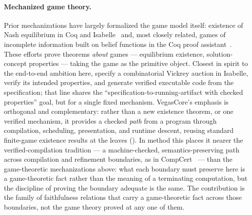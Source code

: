 \paragraph{Mechanized game theory.}
Prior mechanizations have largely formalized the game model itself: existence of
Nash equilibrium in Coq and Isabelle~\citep{LeRoux2017NashCoqIsabelle} and, most
closely related, games of incomplete information built on belief functions in
the Coq proof assistant~\citep{PomeretCoquot2023BelGames}.  These efforts prove
theorems
\emph{about} games --- equilibrium existence, solution-concept properties ---
taking the game as the primitive object.  Closest in spirit to the end-to-end
ambition here, \citet{Caminati2015Auction} specify a combinatorial Vickrey
auction in Isabelle, verify its intended properties, and generate verified
executable code from the specification; that line shares the
``specification-to-running-artifact with checked properties'' goal, but for a
single fixed mechanism.  VegasCore's emphasis is orthogonal
and complementary: rather than a new existence theorem, or one verified
mechanism, it provides a checked
\emph{path} from a program through compilation, scheduling, presentation, and
runtime descent, reusing standard finite-game existence results at the leaves
().  In method this places it nearer the
verified-compilation tradition --- a machine-checked, semantics-preserving
path across compilation and refinement boundaries, as in
CompCert~\citep{Leroy2009CompCert} --- than the game-theoretic mechanizations
above: what each boundary must preserve here is a game-theoretic fact rather
than the meaning of a terminating computation, but the discipline of proving
the boundary adequate is the same.  The contribution is the family of
faithfulness relations that carry a game-theoretic fact across those
boundaries, not the game theory proved at any one of them.

